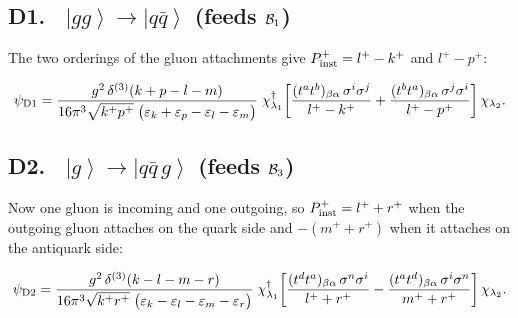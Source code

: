\documentclass[11pt]{article}
\newcommand{\ibarh}[2]{\draw[line width=1.1pt] (#1,#2-0.13) -- (#1,#2+0.13);}
\newcommand{\dg}{\dagger}
\newcommand{\eps}{\varepsilon}
\newcommand{\dthree}{\delta^{(3)}}
\newcommand{\ket}[1]{\left|#1\right\rangle}
\newcommand{\qk}[3]{q^{#1}_{#2}(#3)}
\newcommand{\aqk}[3]{\bar q^{#1}_{#2}(#3)}
\newcommand{\gl}[3]{g^{#1}_{#2}(#3)}
\begin{document}
\subsection*{D1. \ $\ket{gg}\to\ket{q\bar q}$ \quad (feeds $\mathcal{B}_{1}$)}
\begin{center}
\end{center}
The two orderings of the gluon attachments give $P^{+}_{\rm inst}=l^{+}-k^{+}$ and
$l^{+}-p^{+}$:
\begin{res}
\begin{equation}
\psi_{\rm D1}=\frac{g^{2}\,\dthree(k+p-l-m)}
{16\pi^{3}\sqrt{k^{+}p^{+}}\;\big(\eps_{k}+\eps_{p}-\eps_{l}-\eps_{m}\big)}\;
\chi^{\dg}_{\lambda_{1}}\!\left[
\frac{(t^{a}t^{b})_{\beta\alpha}\,\sigma^{i}\sigma^{j}}{l^{+}-k^{+}}
+\frac{(t^{b}t^{a})_{\beta\alpha}\,\sigma^{j}\sigma^{i}}{l^{+}-p^{+}}\right]\chi_{\lambda_{2}} .
\label{eq:D1}
\end{equation}
\end{res}

\subsection*{D2. \ $\ket{g}\to\ket{q\bar q\,g}$ \quad (feeds $\mathcal{B}_{3}$)}
\begin{center}
\end{center}
Now one gluon is incoming and one outgoing, so $P^{+}_{\rm inst}=l^{+}+r^{+}$ when the outgoing
gluon attaches on the quark side and $-(m^{+}+r^{+})$ when it attaches on the antiquark side:
\begin{res}
\begin{equation}
\psi_{\rm D2}=\frac{g^{2}\,\dthree(k-l-m-r)}
{16\pi^{3}\sqrt{k^{+}r^{+}}\;\big(\eps_{k}-\eps_{l}-\eps_{m}-\eps_{r}\big)}\;
\chi^{\dg}_{\lambda_{1}}\!\left[
\frac{(t^{d}t^{a})_{\beta\alpha}\,\sigma^{n}\sigma^{i}}{l^{+}+r^{+}}
-\frac{(t^{a}t^{d})_{\beta\alpha}\,\sigma^{i}\sigma^{n}}{m^{+}+r^{+}}\right]\chi_{\lambda_{2}} .
\label{eq:D2}
\end{equation}
\end{res}
\end{document}
